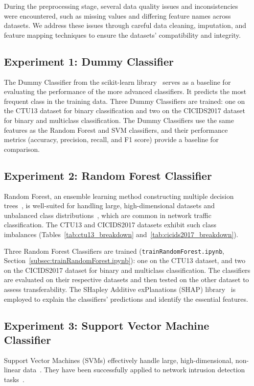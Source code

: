 During the preprocessing stage, several data quality issues and inconsistencies were encountered, such as missing values and differing feature names across datasets. We address these issues through careful data cleaning, imputation, and feature mapping techniques to ensure the datasets' compatibility and integrity.

\subsection{Experiment 1: Dummy Classifier}\label{subsec:baseline-performance}
The Dummy Classifier from the scikit-learn library~\cite{pedregosa2011scikit} serves as a baseline for evaluating the performance of the more advanced classifiers. It predicts the most frequent class in the training data. Three Dummy Classifiers are trained: one on the CTU13 dataset for binary classification and two on the CICIDS2017 dataset for binary and multiclass classification. The Dummy Classifiers use the same features as the Random Forest and SVM classifiers, and their performance metrics (accuracy, precision, recall, and F1 score) provide a baseline for comparison.

\subsection{Experiment 2: Random Forest Classifier}\label{subsec:random-forest-classifier}
Random Forest, an ensemble learning method constructing multiple decision trees~\cite{hastie2009random}, is well-suited for handling large, high-dimensional datasets and unbalanced class distributions~\cite{farnaaz2016random}, which are common in network traffic classification. The CTU13 and CICIDS2017 datasets exhibit such class imbalances (Tables~\ref{tab:ctu13_breakdown} and~\ref{tab:cicids2017_breakdown}).

Three Random Forest Classifiers are trained (\texttt{trainRandomForest.ipynb}, Section~\ref{subsec:trainRandomForest.ipynb}): one on the CTU13 dataset, and two on the CICIDS2017 dataset for binary and multiclass classification. The classifiers are evaluated on their respective datasets and then tested on the other dataset to assess transferability. The SHapley Additive exPlanations (SHAP) library~\cite{lundberg2017unified} is employed to explain the classifiers' predictions and identify the essential features.

\subsection{Experiment 3: Support Vector Machine Classifier}\label{subsec:support-vector-machine-classifier}
Support Vector Machines (SVMs) effectively handle large, high-dimensional, non-linear data~\cite{cortes1995support, scholkopf2002learning}. They have been successfully applied to network intrusion detection tasks~\cite{kim2003network, teng2017svm}.

